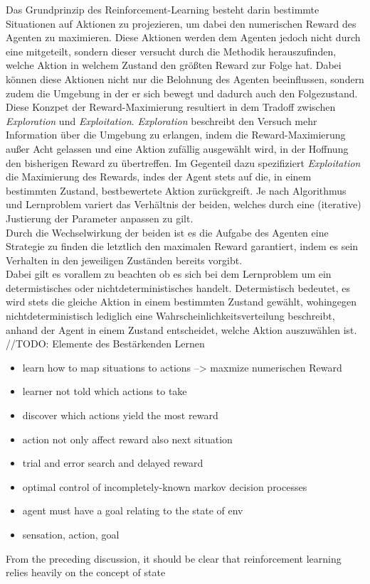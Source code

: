 Das Grundprinzip des Reinforcement-Learning besteht darin bestimmte Situationen auf Aktionen zu projezieren, um dabei den numerischen Reward des Agenten zu maximieren. Diese Aktionen werden dem Agenten jedoch nicht durch eine  mitgeteilt, sondern dieser versucht durch die  Methodik herauszufinden, welche Aktion in welchem Zustand  den größten Reward zur Folge hat. Dabei können diese Aktionen nicht nur die Belohnung des Agenten beeinflussen, sondern zudem die Umgebung in der er sich bewegt und dadurch auch den Folgezustand. \\
Diese Konzpet der Reward-Maximierung resultiert in dem Tradoff zwischen \textit{Exploration} und \textit{Exploitation}. \textit{Exploration} beschreibt den Versuch mehr Information über die Umgebung zu erlangen, indem die Reward-Maximierung außer Acht gelassen und eine Aktion zufällig ausgewählt wird, in der Hoffnung den bisherigen Reward zu übertreffen. Im Gegenteil dazu spezifiziert \textit{Exploitation} die Maximierung des Rewards, indes der Agent stets auf die, in einem bestimmten Zustand, bestbewertete Aktion zurückgreift.
Je nach Algorithmus und Lernproblem variert das Verhältnis der beiden, welches durch eine (iterative) Justierung der Parameter anpassen zu gilt. \\
Durch die Wechselwirkung der beiden ist es die Aufgabe des Agenten eine Strategie zu finden die letztlich den maximalen Reward garantiert, indem es sein Verhalten in den jeweiligen Zuständen bereits vorgibt. \\
Dabei gilt es vorallem zu beachten ob es sich bei dem Lernproblem um ein determistisches oder nichtdeterministisches handelt. Determistisch bedeutet, es wird stets die gleiche Aktion in einem bestimmten Zustand gewählt, wohingegen nichtdeterministisch lediglich eine Wahrscheinlichkeitsverteilung beschreibt, anhand der Agent in einem Zustand entscheidet, welche Aktion auszuwählen ist. 
//TODO: Elemente des Bestärkenden Lernen
%
\begin{itemize}
    \item learn how to map situations to actions --> maxmize numerischen Reward
    \item learner not told which actions to take
    \item discover which actions yield the most reward
    \item action not only affect reward also next situation
    \item trial and error search and delayed reward
    
    \item optimal control of incompletely-known markov decision processes
    \item agent must have a goal relating to the state of env
    \item sensation, action, goal
\end{itemize}

From the preceding discussion, it should be clear that reinforcement learning relies heavily on the concept of state

